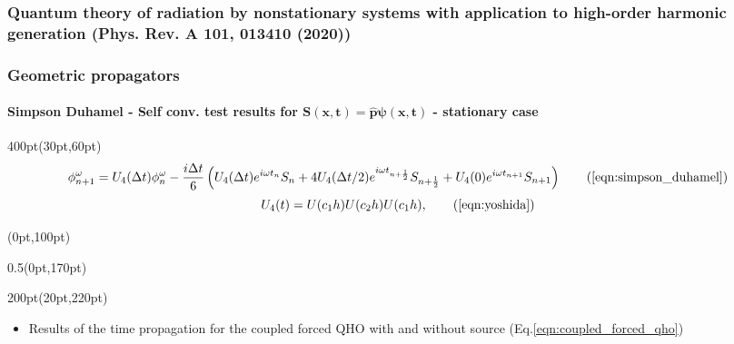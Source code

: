 \begin{frame}
\frametitle{Quantum theory of radiation by nonstationary systems 
	with application to high-order harmonic generation
        (Phys. Rev. A 101, 013410 (2020))}
\frametitle{Geometric propagators}
	\framesubtitle{Simpson Duhamel -
	Self conv. test results for 
	$\mathbf{S(x,t) = \hat{p}\psi(x,t)}$ - stationary case }
\footnotesize
\begin{textblock*}{400pt}(30pt,60pt)
	\begin{equation}
		\phi^\omega_{n+1} = U_4(\Delta t) \phi^\omega_{n}
		- \frac{i\Delta t}{6}\left(
		  U_4(\Delta t)  e^{i\omega t_{n}}     S_{n}
		+ 4 U_4(\Delta t/2) e^{i\omega t_{n+\frac{1}{2}}} S_{n+\frac{1}{2}}
		+   U_4(0) e^{i\omega t_{n+1}} S_{n+1}
		\right)
		 \tag{\ref{eqn:simpson_duhamel}}
	\end{equation}
 	\begin{equation}
		U_4(t) =  U(c_1h)  U(c_2h)  U(c_1h),    
		 \tag{\ref{eqn:yoshida}}
 	\end{equation}
\end{textblock*}

\footnotesize
\begin{textblock*}{\linewidth}(0pt,100pt)
\end{textblock*}
\begin{textblock*}{0.5\linewidth}(0pt,170pt)
\end{textblock*}


\begin{textblock*}{200pt}(20pt,220pt)
	\begin{itemize}
	 \item Results of the time propagation for the coupled forced QHO
		 with and without source (Eq.\ref{eqn:coupled_forced_qho})
	\end{itemize}
\end{textblock*}



\end{frame}
